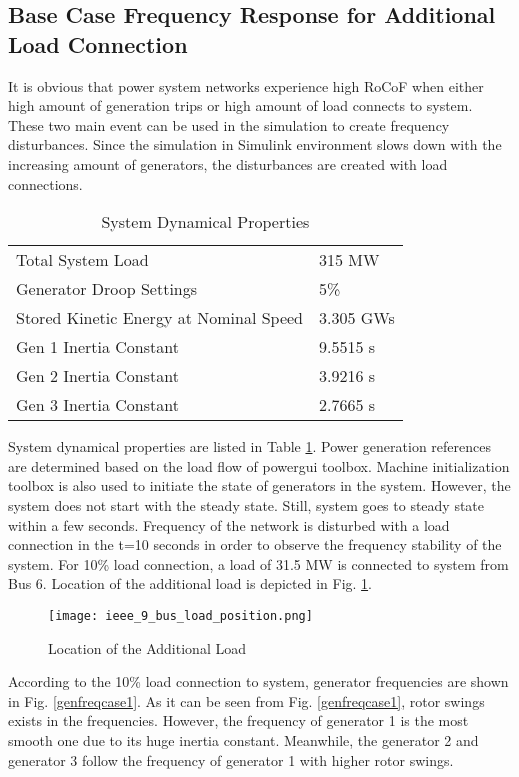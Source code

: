 \subsection{Base Case Frequency Response for Additional Load Connection}
It is obvious that power system networks experience high RoCoF when either high amount of generation trips or high amount of load connects to system. These two main event can be used in the simulation to create frequency disturbances. Since the simulation in Simulink environment slows down with the increasing amount of generators, the disturbances are created with load connections.\par
\begin{table}[]
	\centering
	\begin{tabular}{ll}
		\hline
		Total System Load                      & 315 MW    \\
		Generator Droop Settings               & 5\%       \\
		Stored Kinetic Energy at Nominal Speed & 3.305 GWs \\
		Gen 1 Inertia Constant                 & 9.5515 s  \\
		Gen 2 Inertia Constant                 & 3.9216 s  \\
		Gen 3 Inertia Constant                 & 2.7665 s  \\ \hline
	\end{tabular}
	\caption{System Dynamical Properties}
	\label{systemdynamicaldata}
\end{table}
System dynamical properties are listed in Table \ref{systemdynamicaldata}. Power generation references are determined based on the load flow of powergui toolbox. Machine initialization toolbox is also used to initiate the state of generators in the system. However, the system does not start with the steady state. Still, system goes to steady state within a few seconds. Frequency of the network is disturbed with a load connection in the t=10 seconds in order to observe the frequency stability of the system. For 10\% load connection, a load of 31.5 MW is connected to system from Bus 6. Location of the additional load is depicted in Fig. \ref{ieee_9_bus_load}.\par
\begin{figure}[h!]
	\centering
	\texttt{[image: ieee\_9\_bus\_load\_position.png]}
	\caption{Location of the Additional Load}
	\label{ieee_9_bus_load}
\end{figure}
According to the 10\% load connection to system, generator frequencies are shown in Fig. \ref{genfreqcase1}. As it can be seen from Fig. \ref{genfreqcase1}, rotor swings exists in the frequencies. However, the frequency of generator 1 is the most smooth one due to its huge inertia constant. Meanwhile, the generator 2 and generator 3 follow the frequency of generator 1 with higher rotor swings.
